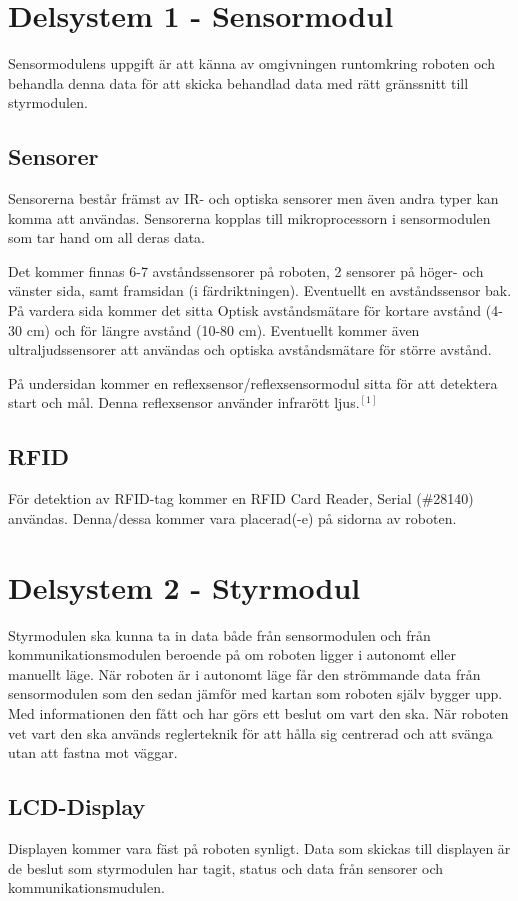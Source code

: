 \documentclass[11pt]{article}
\begin{document}
\begin{flushleft}
\section{Delsystem 1 - Sensormodul}
Sensormodulens uppgift är att känna av omgivningen runtomkring roboten och behandla denna data för att skicka behandlad data med rätt gränssnitt till styrmodulen.


\subsection{Sensorer}
Sensorerna består främst av IR- och optiska sensorer men även andra typer kan komma att användas. Sensorerna kopplas till mikroprocessorn i sensormodulen som tar hand om all deras data.

Det kommer finnas 6-7 avståndssensorer på roboten, 2 sensorer på höger- och vänster sida, samt framsidan (i färdriktningen). Eventuellt en avståndssensor bak. På vardera sida kommer det sitta Optisk avståndsmätare för kortare avstånd (4-30 cm) och för längre avstånd (10-80 cm). Eventuellt kommer även ultraljudssensorer att användas och optiska avståndsmätare för större avstånd.

På undersidan kommer en reflexsensor/reflexsensormodul sitta för att detektera start och mål. Denna reflexsensor använder infrarött ljus.$^{[1]}$

\subsection{RFID}
För detektion av RFID-tag kommer en RFID Card Reader, Serial (\#28140) användas. Denna/dessa kommer vara placerad(-e) på sidorna av roboten.

\section{Delsystem 2 - Styrmodul}
Styrmodulen ska kunna ta in data både från sensormodulen och från kommunikationsmodulen beroende på om roboten ligger i autonomt eller manuellt läge. När roboten är i autonomt läge får den strömmande data från sensormodulen som den sedan jämför med kartan som roboten själv bygger upp. Med informationen den fått och har görs ett beslut om vart den ska. När roboten vet vart den ska används reglerteknik för att hålla sig centrerad och att svänga utan att fastna mot väggar.    


\subsection{LCD-Display}
Displayen kommer vara fäst på roboten synligt. Data som skickas till displayen är de beslut som styrmodulen har tagit, status och data från sensorer och kommunikationsmudulen.


\end{flushleft}
\end{document}
